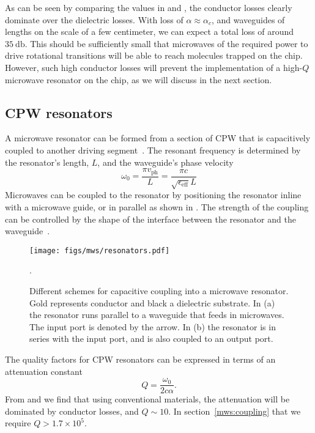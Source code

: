 As can be seen by comparing the values in  and
, the conductor losses clearly dominate over
the dielectric losses.
%
With loss of $\alpha \approx \alpha_c$, and waveguides of lengths on
the scale of a few centimeter, we can expect a total loss of around
$\SI{35}{\decibel}$. This
should be sufficiently small that microwaves of the required power to drive
rotational transitions will be able to reach molecules
trapped on the chip.~\cite{Treutlein2008}
%
However, such high conductor losses will prevent the implementation of a
high-$Q$ microwave resonator on the chip, as we will discuss in the next
section.

\subsection{CPW resonators}
\label{mws:resonators}

A microwave resonator can be formed from a section of CPW that is capacitively
coupled to another driving segment~\cite{Day2003}. The resonant frequency is
determined by the resonator's length, $L$, and the waveguide's phase
velocity~\cite{Simons2004}
%
\begin{equation}
  \omega_0 = \frac{\pi v_\text{ph}}{L} = \frac{\pi
  c}{\sqrt{\epsilon_\text{eff}} L}
\end{equation}
%
Microwaves can be coupled to the resonator by positioning the resonator inline
with a microwave guide, or in parallel as shown in
. The strength of the coupling can be controlled by the shape of the
interface between the resonator and the waveguide~\cite{doi:10.1063/1.3010859}.

\begin{figure}
  \centering
  \texttt{[image: figs/mws/resonators.pdf]}
  \caption[Capacative coupling schemes for resonator]{
    Different schemes for capacitive coupling into a microwave
    resonator. Gold represents conductor and black a dielectric substrate. In
    (a) the resonator runs parallel to a waveguide that feeds in microwaves.
    The input port is denoted by the arrow. In (b) the resonator is in series
    with the input port, and is also coupled to an output port.
  }
  \label{mws:fig:resonators}.
\end{figure}

The quality factors for CPW resonators can be expressed in terms of an
attenuation constant
%
\begin{equation}
  Q = \frac{\omega_0}{2c\alpha}.
  \label{mws:eqn:Qalpha}
\end{equation}
%
From  and  we
find that using conventional materials, the attenuation will be dominated
by conductor losses, and $Q\sim10$. In section~\ref{mws:coupling} that we
require $Q > 1.7 \times 10^5$.

